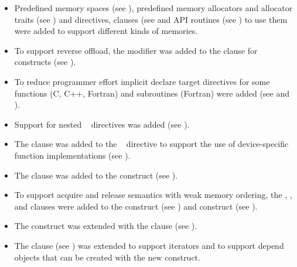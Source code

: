\begin{itemize}
\item Predefined memory spaces (see ), 
      predefined memory allocators and allocator traits (see 
      ) and directives, clauses (see 
       and API routines (see 
      ) to use them were added 
      to support different kinds of memories.

\item To support reverse offload, the  modifier was
      added to the  clause for  constructs (see
      ).

\item To reduce programmer effort implicit declare target directives for
      some functions (C, C++, Fortran) and subroutines (Fortran) were added
      (see  and
      ).

\item Support for nested ~ directives was added
      (see ).

\item The  clause was added to the
      ~ directive to support the use of
      device-specific function implementations (see
      ).

\item The  clause was added to the  construct
      (see ).

\item To support acquire and release semantics with weak memory ordering, the
      , , and  clauses were added to
      the  construct (see ) and
       construct (see ).

\item The  construct was extended with the  clause
      (see ).

\item The  clause (see ) was
      extended to support iterators and to support depend objects that can be created with the new
       construct.


\end{itemize}
